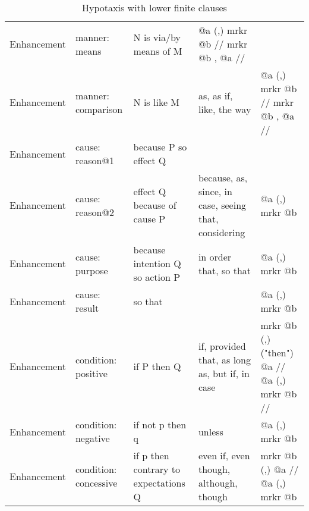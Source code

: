 \begin{landscape}
\begin{table}[]
{\begin{tabulary}{3\textwidth}{p{7em}p{10em}p{10em}p{18em}p{18em}}
        Enhancement & manner: means & N is via/by means of M & @a (,) mrkr @b // mrkr @b , @a // &  \\
        Enhancement & manner: comparison & N is like M & as, as if, like, the way & @a (,) mrkr @b // mrkr @b , @a // \\
        Enhancement & cause: reason@1 & because P so effect Q &  &  \\
        Enhancement & cause: reason@2 & effect Q because of cause P & because, as, since, in case, seeing that, considering & @a (,) mrkr @b \\
        Enhancement & cause: purpose & because intention Q so action P & in order that, so that & @a (,) mrkr @b \\
        Enhancement & cause: result & so that &  & @a (,) mrkr @b \\
        Enhancement & condition: positive & if P then Q & if, provided that, as long as, but if, in case & mrkr @b (,) ("then") @a // @a (,) mrkr @b // \\
        Enhancement & condition: negative & if not p then q & unless & @a (,) mrkr @b \\
        Enhancement & condition: concessive & if p then contrary to expectations Q & even if, even though, although, though & mrkr @b (,) @a // @a (,) mrkr @b \\ \bottomrule
        \end{tabulary}%
    }
    \caption{Hypotaxis with lower finite clauses}
    \label{tab:hytpotaxis-finite}
    \end{table}
    \end{landscape}
    
    \newpage
    
